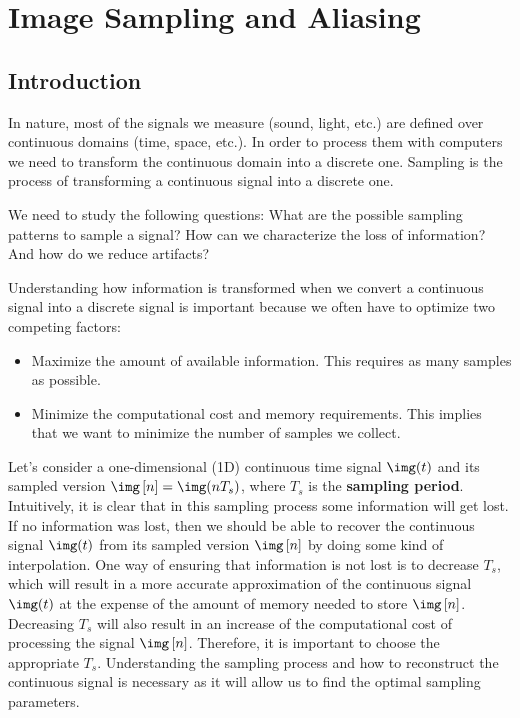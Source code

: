 
\chapter{Image Sampling and Aliasing}
\label{chapter:sampling}



\section{Introduction}

In nature, most of the signals we measure (sound, light, etc.) are defined over continuous domains (time, space, etc.). In order to process them with computers we need to transform the continuous domain into a discrete one. Sampling is the process of transforming a continuous signal into a discrete one.

We need to study the following questions: What are the possible sampling patterns to sample a signal? How can we characterize the loss of information? And how do we reduce artifacts?

Understanding how information is transformed when we convert a continuous signal into a discrete signal is important because we often have to optimize two competing factors:
\begin{itemize}
    \item Maximize the amount of available information. This requires as many samples as possible.
    \item Minimize the computational cost and memory requirements. This implies that we want to minimize the number of samples we collect.
\end{itemize}

Let's consider a one-dimensional (1D) continuous time signal $\img (t)$ and its sampled version $\img \left[n \right] = \img(n T_s)$, where $T_s$ is the {\bf sampling period}. Intuitively, it is clear that in this sampling process some information will get lost. If no information was lost, then we should be able to recover the continuous signal $\img (t)$ from its sampled version $\img \left[n \right]$ by doing some kind of interpolation.  One way of ensuring that information is not lost is to decrease $T_s$, which will result in a more accurate approximation of the continuous signal $\img (t)$ at the expense of the amount of memory needed to store $\img  \left[n \right]$.  Decreasing $T_s$ will also result in an increase of the computational cost of processing the signal $\img \left[n \right]$. Therefore, it is important to choose the appropriate $T_s$. Understanding the sampling process and how to reconstruct the continuous signal is necessary as it will allow us to find the optimal sampling parameters.

